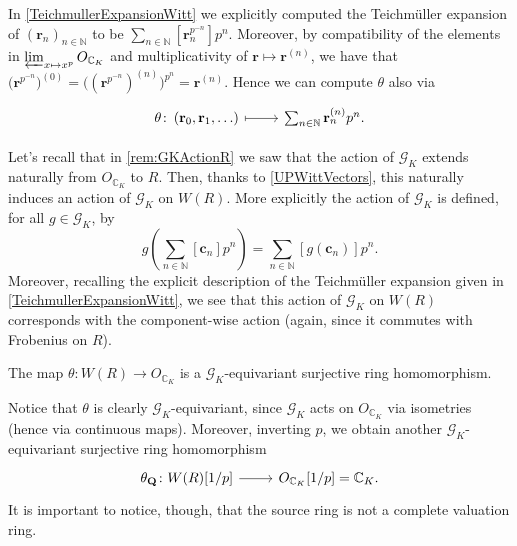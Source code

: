 \begin{rem}[]
	In \cref{TeichmullerExpansionWitt} we explicitly computed the Teichmüller
	expansion of $\left( \mathbf{r}_n \right)_{n \in \mathbb{N}}$
	to be $\sum_{n \in \mathbb{N} }^{  } [\mathbf{r}_n^{p^{-n}}] p^n$.
	Moreover, by compatibility of the elements in $\varprojlim_{x \mapsto x^p} O_{\mathbb{C}_K}$
	and multiplicativity of $\mathbf{r} \mapsto \mathbf{r}^{(n)}$,
	we have that $\big( \mathbf{r}^{p^{-n}} \big)^{(0)} = \big( (\mathbf{r}^{p^{-n}})^{(n)} \big)^{p^n} =
	\mathbf{r}^{(n)}$.
	Hence we can compute $\theta$ also via
	\begin{equation*}
	\begin{tikzcd}
		\theta\colon 
		\left( \mathbf{r}_0, \mathbf{r}_1, \ldots \right)
		\arrow[r, "", mapsto] &
		\sum_{n \in \mathbb{N} }^{  } \mathbf{r}_n^{(n)} p^n
	.\end{tikzcd}
	\end{equation*}
\end{rem}


\begin{rem}[]\label{GKActionWR}
	Let's recall that in \cref{rem:GKActionR} we saw that
	the action of $\mathscr{G}_K$ extends naturally from $O_{\mathbb{C}_K}$ to $R$.
	Then, thanks to \cref{UPWittVectors}, this naturally induces
	an action of $\mathscr{G}_K$ on $W(R)$.
	More explicitly the action of $\mathscr{G}_K$ is defined,
	for all \(g \in \mathscr{G}_K\), by
	\begin{equation*}
		g \left( \sum_{n \in \mathbb{N} }^{  } [\mathbf{c}_n] p^n \right) =
		\sum_{n \in \mathbb{N} }^{  } [g(\mathbf{c}_n)] p^n
	.\end{equation*}
	Moreover, recalling the explicit description of the Teichmüller
	expansion given in \cref{TeichmullerExpansionWitt}, we see that this
	action of $\mathscr{G}_K$ on $W(R)$ corresponds with the component-wise action
	(again, since it commutes with Frobenius on $R$).
\end{rem}


\begin{lem}
	The map $\theta\colon W(R) \to O_{\mathbb{C}_K}$ is a
	$\mathscr{G}_K$-equivariant surjective ring homomorphism.
\end{lem} 


\begin{rem}[]
	Notice that $\theta$ is clearly $\mathscr{G}_K$-equivariant,
	since $\mathscr{G}_K$ acts on $O_{\mathbb{C}_K}$
	via isometries (hence via continuous maps).
	Moreover, inverting $p$, we obtain another $\mathscr{G}_K$-equivariant surjective ring homomorphism
	\begin{equation*}
	\begin{tikzcd}[row sep = 0ex
		,/tikz/column 1/.append style={anchor=base east}
		,/tikz/column 2/.append style={anchor=base west}]
		\theta_{\mathbf{Q}}\colon W(R)[1/p] \arrow[r, "", rightarrow] &
		O_{\mathbb{C}_K}[1/p] = \mathbb{C}_K
	.\end{tikzcd}
	\end{equation*} 
	It is important to notice, though, that the source ring is not a complete valuation ring.
\end{rem}


